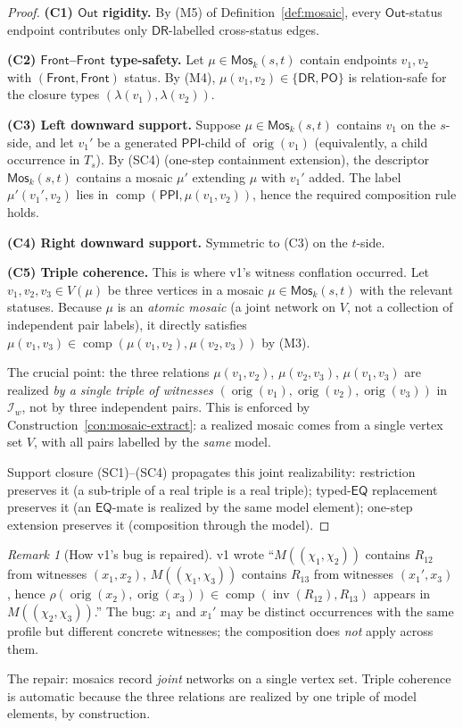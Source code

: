 \documentclass[11pt]{article}
\theoremstyle{definition}
\theoremstyle{remark}
\newtheorem{remark}[theorem]{Remark}
\newcommand{\DR}{\mathsf{DR}}
\newcommand{\PO}{\mathsf{PO}}
\newcommand{\PPI}{\mathsf{PPI}}
\newcommand{\EQ}{\mathsf{EQ}}
\newcommand{\comp}{\operatorname{comp}}
\newcommand{\inv}{\operatorname{inv}}
\newcommand{\orig}{\operatorname{orig}}
\newcommand{\Out}{\mathsf{Out}}
\newcommand{\Front}{\mathsf{Front}}
\newcommand{\Mos}{\mathsf{Mos}}
\begin{document}
\begin{proof}

\noindent\textbf{(C1) $\Out$ rigidity.}\;
By (M5) of Definition~\ref{def:mosaic}, every $\Out$-status
endpoint contributes only $\DR$-labelled cross-status edges.

\noindent\textbf{(C2) $\Front$--$\Front$ type-safety.}\;
Let $\mu \in \Mos_k(s,t)$ contain endpoints $v_1, v_2$ with
$(\Front,\Front)$ status.  By (M4),
$\mu(v_1,v_2) \in \{\DR,\PO\}$ is relation-safe for the closure
types $(\lambda(v_1), \lambda(v_2))$.

\noindent\textbf{(C3) Left downward support.}\;
Suppose $\mu \in \Mos_k(s,t)$ contains $v_1$ on the $s$-side, and
let $v_1'$ be a generated $\PPI$-child of $\orig(v_1)$
(equivalently, a child occurrence in $T_s$).  By (SC4) (one-step
containment extension), the descriptor $\Mos_k(s,t)$ contains a
mosaic $\mu'$ extending $\mu$ with $v_1'$ added.  The label
$\mu'(v_1', v_2)$ lies in $\comp(\PPI, \mu(v_1,v_2))$, hence the
required composition rule holds.

\noindent\textbf{(C4) Right downward support.}\;
Symmetric to (C3) on the $t$-side.

\noindent\textbf{(C5) Triple coherence.}\;
This is where v1's witness conflation occurred.  Let $v_1, v_2, v_3
\in V(\mu)$ be three vertices in a mosaic $\mu \in \Mos_k(s,t)$
with the relevant statuses.  Because $\mu$ is an \emph{atomic
mosaic} (a joint network on $V$, not a collection of independent
pair labels), it directly satisfies $\mu(v_1, v_3) \in
\comp(\mu(v_1, v_2), \mu(v_2, v_3))$ by (M3).

The crucial point: the three relations $\mu(v_1, v_2)$, $\mu(v_2,
v_3)$, $\mu(v_1, v_3)$ are realized \emph{by a single triple of
witnesses} $(\orig(v_1), \orig(v_2), \orig(v_3))$ in
$\mathcal{I}_w$, not by three independent pairs.  This is enforced
by Construction~\ref{con:mosaic-extract}: a realized mosaic comes
from a single vertex set $V$, with all pairs labelled by the
\emph{same} model.

Support closure (SC1)--(SC4) propagates this joint realizability:
restriction preserves it (a sub-triple of a real triple is a real
triple); typed-$\EQ$ replacement preserves it (an $\EQ$-mate is
realized by the same model element); one-step extension preserves
it (composition through the model).
\end{proof}

\begin{remark}[How v1's bug is repaired]
v1 wrote ``$M((\chi_1,\chi_2))$ contains $R_{12}$ from witnesses
$(x_1,x_2)$, $M((\chi_1,\chi_3))$ contains $R_{13}$ from witnesses
$(x_1', x_3)$, hence $\rho(\orig(x_2),\orig(x_3)) \in
\comp(\inv(R_{12}), R_{13})$ appears in $M((\chi_2,\chi_3))$.''  The
bug: $x_1$ and $x_1'$ may be distinct occurrences with the same
profile but different concrete witnesses; the composition does
\emph{not} apply across them.

The repair: mosaics record \emph{joint} networks on a single vertex
set.  Triple coherence is automatic because the three relations are
realized by one triple of model elements, by construction.
\end{remark}
\end{document}

